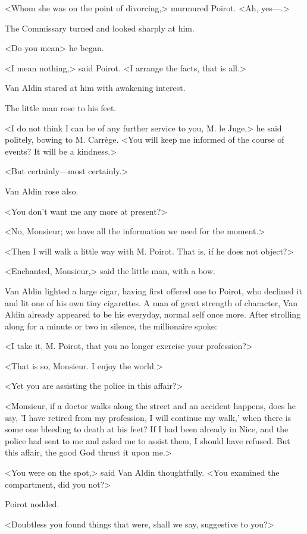 <Whom she was on the point of divorcing,> murmured Poirot. <Ah, yes—.>

The Commissary turned and looked sharply at him.

<Do you mean\longdash> he began.

<I mean nothing,> said Poirot. <I arrange the facts, that is all.>

Van Aldin stared at him with awakening interest.

The little man rose to his feet.

<I do not think I can be of any further service to you, M. le Juge,> he said politely, bowing to M. Carrège. <You will keep me informed of the course of events? It will be a kindness.>

<But certainly—most certainly.>

Van Aldin rose also.

<You don't want me any more at present?>

<No, Monsieur; we have all the information we need for the moment.>

<Then I will walk a little way with M. Poirot. That is, if he does not object?>

<Enchanted, Monsieur,> said the little man, with a bow.

Van Aldin lighted a large cigar, having first offered one to Poirot, who declined it and lit one of his own tiny cigarettes. A man of great strength of character, Van Aldin already appeared to be his everyday, normal self once more. After strolling along for a minute or two in silence, the millionaire spoke:

<I take it, M. Poirot, that you no longer exercise your profession?>

<That is so, Monsieur. I enjoy the world.>

<Yet you are assisting the police in this affair?>

<Monsieur, if a doctor walks along the street and an accident happens, does he say, 'I have retired from my profession, I will continue my walk,' when there is some one bleeding to death at his feet? If I had been already in Nice, and the police had sent to me and asked me to assist them, I should have refused. But this affair, the good God thrust it upon me.>

<You were on the spot,> said Van Aldin thoughtfully. <You examined the compartment, did you not?>

Poirot nodded.

<Doubtless you found things that were, shall we say, suggestive to you?>

